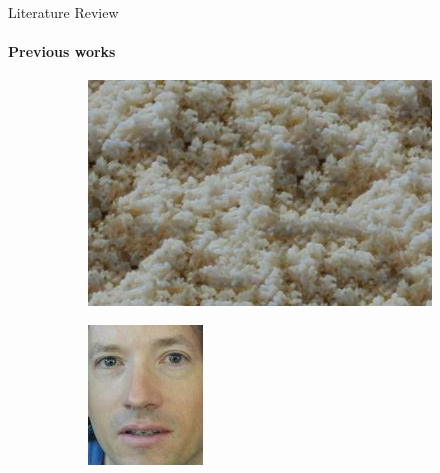 \documentclass{beamer}
\begin{document}
\begin{frame}{Literature Review}
    \framesubtitle{Previous works}
    \begin{figure}[H]
        \centering
        \begin{subfigure}[b]{.3\textwidth}
            \includegraphics[width=.8\textwidth]{img/previous_works_style.png}
        \end{subfigure}
        \begin{subfigure}[b]{.3\textwidth}
            \includegraphics[width=.8\textwidth]{img/previous_works_content.png}
        \end{subfigure}
        \begin{subfigure}[b]{.3\textwidth}

\end{subfigure}
\end{figure}
\end{frame}
\end{document}
